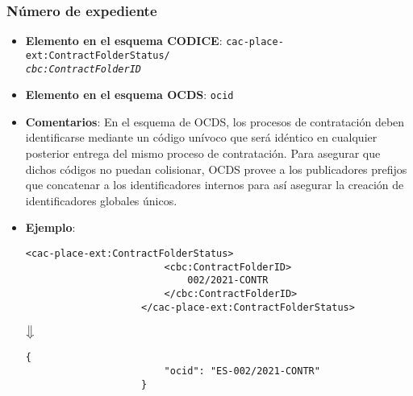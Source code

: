         \subsubsection{Número de expediente}
        \begin{itemize}
            \item \textbf{Elemento en el esquema CODICE}:
                \tabto{7.6cm} \texttt{cac-place-ext:ContractFolderStatus/} \\
                \tabto{7.6cm} \texttt{\textit{cbc:ContractFolderID}}
            \item \textbf{Elemento en el esquema OCDS}:
                \tabto{7.6cm} \texttt{ocid}
            \item \textbf{Comentarios}: En el esquema de OCDS, los procesos de contratación deben identificarse mediante un código unívoco que será idéntico en cualquier posterior entrega del mismo proceso de contratación. Para asegurar que dichos códigos no puedan colisionar, OCDS provee a los publicadores prefijos que concatenar a los identificadores internos para así asegurar la creación de identificadores globales únicos.
            \item \textbf{Ejemplo}: \\
                \begin{lstlisting}[language=lXML]
                    <cac-place-ext:ContractFolderStatus>
                        <cbc:ContractFolderID>
                            002/2021-CONTR
                        </cbc:ContractFolderID>
                    </cac-place-ext:ContractFolderStatus>
                \end{lstlisting}
                
                \begin{center}
                    $\big\Downarrow$
                \end{center}
                
                \begin{lstlisting}[language=lJSON]
                    {
                        "ocid": "ES-002/2021-CONTR"
                    }
                \end{lstlisting}
        \end{itemize}
        
